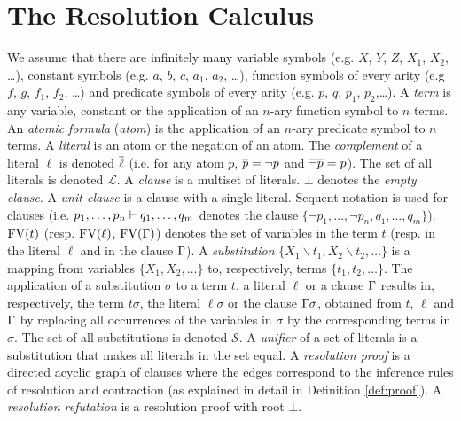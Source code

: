 \section{The Resolution Calculus}

We assume that there are infinitely many variable symbols (e.g. $X$, $Y$, $Z$, $X_1$, $X_2$, \ldots), constant symbols (e.g. $a$, $b$, $c$, $a_1$, $a_2$, \ldots), function symbols of every arity (e.g $f$, $g$, $f_1$, $f_2$, \ldots) and predicate symbols of every arity (e.g. $p$, $q$, $p_1$, $p_2$,\ldots). A \emph{term} is any variable, constant or the application of an $n$-ary function symbol to $n$ terms.
An \emph{atomic formula} (\emph{atom}) is the application of an $n$-ary predicate symbol to $n$ terms. A \emph{literal} is an atom or the negation of an atom. The
\emph{complement} of a literal $\ell$ is denoted $\overline{\ell}$ (i.e. for any atom $p$,
$\overline{p} = \neg p$ and $\overline{\neg p} = p$). The set of all literals is denoted $\mathcal{L}$. A
\emph{clause} is a multiset of literals. $\bot$ denotes the \emph{empty clause}. A \emph{unit clause} is a clause with a single literal. Sequent notation is used for clauses (i.e. $p_1,\ldots,p_n \vdash q_1,\ldots, q_m$ denotes the clause $\{ \neg p_1,\ldots, \neg p_n, q_1, \ldots, q_m \}$).
$\mathrm{FV}(t)$ (resp. $\mathrm{FV}(\ell)$, $\mathrm{FV}(\Gamma)$) denotes the set of variables in the term $t$ (resp. in the literal $\ell$ and in the clause $\Gamma$).
A \emph{substitution} $\{ X_1\backslash t_1, X_2 \backslash t_2, \ldots \}$ is a mapping from variables $\{ X_1, X_2, \ldots \}$ to, respectively, terms $\{t_1, t_2, \ldots \}$. The application of a substitution $\sigma$ to a term $t$, a literal $\ell$ or a clause $\Gamma$ results in, respectively, the term $t \sigma$, the literal $\ell \sigma$ or the clause $\Gamma \sigma$, obtained from $t$, $\ell$ and $\Gamma$ by replacing all occurrences of the variables in $\sigma$ by the corresponding terms in $\sigma$. The set of all substitutions is denoted $\mathcal{S}$. A \emph{unifier} of a set of literals is a substitution that makes all literals in the set equal.
A \emph{resolution proof} is a directed acyclic graph of clauses where the edges correspond to the inference rules of resolution and contraction (as explained in detail in Definition \ref{def:proof}). A \emph{resolution refutation} is a resolution proof with root $\bot$.


